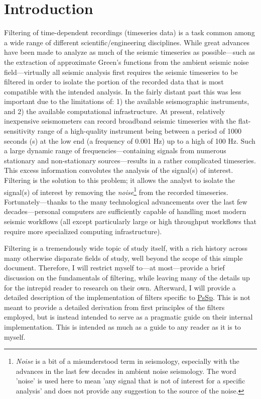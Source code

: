 \documentclass[american, twoside]{article}
\begin{document}
\section{Introduction} \label{Introduction}
Filtering of time-dependent recordings (timeseries data) is a task common among a wide range of different scientific/engineering disciplines.
While great advances have been made to analyze as much of the seismic timeseries as possible---such as the extraction of approximate
Green's functions from the ambient seismic noise field---virtually all seismic analysis first requires the seismic timeseries to
be filtered in order to isolate the portion of the recorded data that is most compatible with the intended analysis. In the fairly
distant past this was less important due to the limitations of: 1) the available seismographic instruments, and 2) the available
computational infrastructure. At present, relatively inexpensive seismometers can record broadband seismic timeseries with the flat-sensitivity
range of a high-quality instrument being between a period of 1000 seconds (s) at the low end (a frequency of 0.001 Hz) up to a high
of 100 Hz. Such a large dynamic range of frequencies---containing signals from numerous stationary and non-stationary sources---results in a
rather complicated timeseries. This excess information convolutes the analysis of the signal(s) of interest.
Filtering is the solution to this problem; it allows the analyst to isolate the signal(s) of interest by removing the \textit{noise}\footnote{\textit{Noise} is a bit of a misunderstood term in
seismology, especially with the advances in the last few decades in ambient noise seismology. The word 'noise' is used here to mean 'any
signal that is not of interest for a specific analysis' and does not provide any suggestion to the source of the noise.} from the
recorded timeseries. Fortunately---thanks to the many technological advancements over the last few decades---personal computers are sufficiently
capable of handling most modern seismic workflows (all except particularly large or high throughput workflows that require more specialized
computing infrastructure).\cite{laplaceWikipedia}

Filtering is a tremendously wide topic of study itself, with a rich history across many otherwise disparate fields of study, well
beyond the scope of this simple document. Therefore, I will restrict myself to---at most---provide a brief discussion
on the fundamentals of filtering, while leaving many of the details up for the intrepid reader to research on their own. Afterward,
I will provide a detailed description of the implementation of filters specific to \href{https://github.com/arbCoding/PsSp}{PsSp}.
This is not meant to provide a detailed derivation from first principles of the filters employed, but is instead intended to serve as
a pragmatic guide on their internal implementation. This is intended as much as a guide to any reader as it is to myself.
\end{document}
